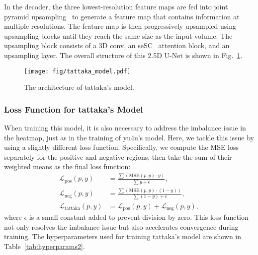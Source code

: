 In the decoder, the three lowest-resolution feature maps are fed into joint pyramid upsampling~\cite{wu2019fastfcn} to generate a feature map that contains information at multiple resolutions. The feature map is then progressively upsampled using upsampling blocks until they reach the same size as the input volume.
The upsampling block consists of a 3D conv, an seSC~\cite{Roy2018} attention block, and an upsampling layer.
The overall structure of this 2.5D U-Net is shown in Fig.~\ref{fig:tattaka_model}.


\begin{figure}[tb]
    \centering
    \texttt{[image: fig/tattaka\_model.pdf]}
    \caption{The architecture of tattaka's model.}
    \label{fig:tattaka_model}
\end{figure}



\subsubsection{Loss Function for tattaka's Model}
When training this model, it is also necessary to address the imbalance issue in the heatmap, just as in the training of yu4u's model.
Here, we tackle this issue by using a slightly different loss function. Specifically, we compute the MSE loss separately for the positive and negative regions, then take the sum of their weighted means as the final loss function:
\begin{equation}
\begin{aligned}
    \mathcal{L}_\text{pos}(p, y) &= \frac{\sum (\text{MSE}(p, y) \cdot y)}{\sum y + \epsilon}, \\
    \mathcal{L}_\text{neg}(p, y) &= \frac{\sum (\text{MSE}(p, y) \cdot (1 - y))}{\sum (1 - y) + \epsilon}, \\
    \mathcal{L}_\text{tattaka}(p, y) &= \mathcal{L}_\text{pos}(p, y) + \mathcal{L}_\text{neg}(p, y),
\end{aligned}
\end{equation}
where $\epsilon$ is a small constant added to prevent division by zero.
This loss function not only resolves the imbalance issue but also accelerates convergence during training.
The hyperparameters used for training tattaka's model are shown in Table~\ref{tab:hyperparams2}.


